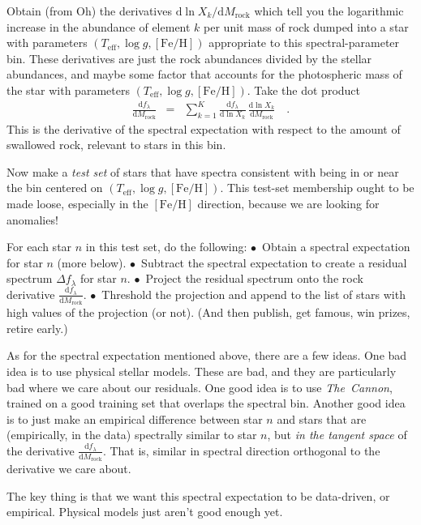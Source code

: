 \documentclass[12pt]{article}
\newcommand{\project}[1]{\textsl{#1}}
\newcommand{\TheCannon}{\project{The~Cannon}}
\newcommand{\dd}{\mathrm{d}}
\newcommand{\teff}{T_{\mathrm{eff}}}
\newcommand{\logg}{\log g}
\newcommand{\feh}{[\mathrm{Fe}/\mathrm{H}]}
\newcommand{\rock}{\mathrm{rock}}
\begin{document}
Obtain (from Oh) the derivatives $\dd\ln X_k/\dd M_\rock$ which tell
you the logarithmic increase in the abundance of element $k$ per unit
mass of rock dumped into a star with parameters $(\teff, \logg, \feh)$
appropriate to this spectral-parameter bin.
These derivatives are just the rock abundances divided by the stellar
abundances, and maybe some factor that accounts for the photospheric
mass of the star with parameters $(\teff, \logg, \feh)$.
Take the dot product
\begin{eqnarray}
  \frac{\dd f_\lambda}{\dd M_\rock} &=&
  \sum_{k=1}^K \frac{\dd f_\lambda}{\dd\ln X_k}\,\frac{\dd\ln X_k}{\dd M_\rock}
  \quad .
\end{eqnarray}
This is the derivative of the spectral expectation with respect to
the amount of swallowed rock, relevant to stars in this bin.

Now make a \emph{test set} of
stars that have spectra consistent with being in or near
the bin centered on $(\teff, \logg, \feh)$.
This test-set membership ought to be made loose, especially in the $\feh$
direction, because we are looking for anomalies!

For each star $n$ in this test set, do the following:
$\bullet$~Obtain a spectral expectation for star $n$ (more below).
$\bullet$~Subtract the spectral expectation to create a residual spectrum
          $\Delta f_\lambda$ for star $n$.
$\bullet$~Project the residual spectrum onto the rock derivative
          $\frac{\dd f_\lambda}{\dd M_\rock}$.
$\bullet$~Threshold the projection and append to the list of stars with
          high values of the projection (or not).
(And then publish, get famous, win prizes, retire early.)

As for the spectral expectation mentioned above, there are a few ideas.
One bad idea is to use physical stellar models. These are bad, and they
are particularly bad where we care about our residuals. One good idea
is to use \TheCannon, trained on a good training set that overlaps the
spectral bin.
Another good idea is to just make an empirical difference between star
$n$ and stars that are (empirically, in the data) spectrally similar to
star $n$, but \emph{in the tangent space} of the derivative 
$\frac{\dd f_\lambda}{\dd M_\rock}$.
That is, similar in spectral direction orthogonal to the derivative we
care about.

The key thing is that we want this spectral expectation to be data-driven,
or empirical.
Physical models just aren't good enough yet.
\end{document}
